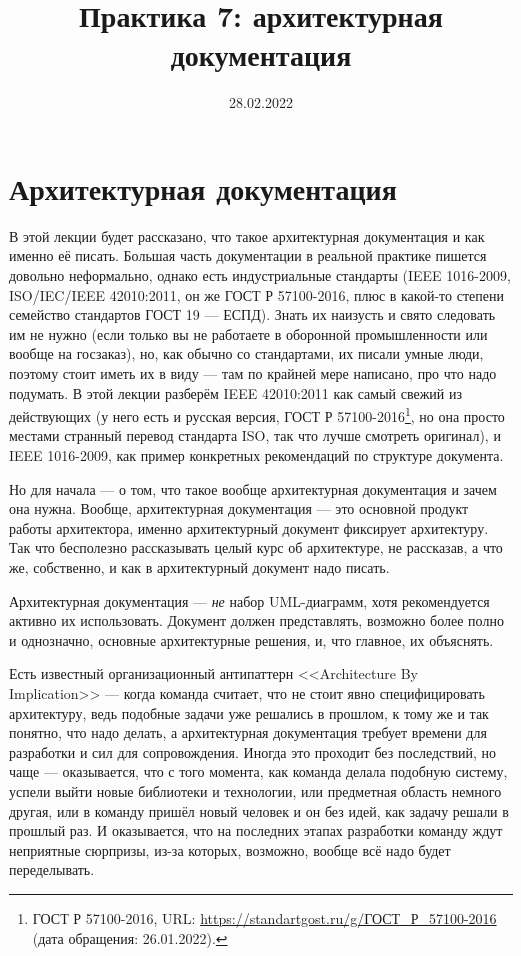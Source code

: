 \documentclass[a5paper]{article}
\title{Практика 7: архитектурная документация}
\author{}
\date{28.02.2022}
\begin{document}
\maketitle
\thispagestyle{empty}

\section{Архитектурная документация}

В этой лекции будет рассказано, что такое архитектурная документация и как именно её писать. Большая часть документации в реальной практике пишется довольно неформально, однако есть индустриальные стандарты (IEEE 1016-2009, ISO/IEC/IEEE 42010:2011, он же ГОСТ Р 57100-2016, плюс в какой-то степени семейство стандартов ГОСТ 19 --- ЕСПД). Знать их наизусть и свято следовать им не нужно (если только вы не работаете в оборонной промышленности или вообще на госзаказ), но, как обычно со стандартами, их писали умные люди, поэтому стоит иметь их в виду --- там по крайней мере написано, про что надо подумать. В этой лекции разберём IEEE 42010:2011 как самый свежий из действующих  (у него есть и русская версия, ГОСТ Р 57100-2016\footnote{ГОСТ Р 57100-2016, URL: \url{https://standartgost.ru/g/ГОСТ_Р_57100-2016} (дата обращения: 26.01.2022).}, но она просто местами странный перевод стандарта ISO, так что лучше смотреть оригинал), и IEEE 1016-2009, как пример конкретных рекомендаций по структуре документа.

Но для начала --- о том, что такое вообще архитектурная документация и зачем она нужна. Вообще, архитектурная документация --- это основной продукт работы архитектора, именно архитектурный документ фиксирует архитектуру. Так что бесполезно рассказывать целый курс об архитектуре, не рассказав, а что же, собственно, и как в архитектурный документ надо писать.

Архитектурная документация --- \emph{не} набор UML-диаграмм, хотя рекомендуется активно их использовать. Документ должен представлять, возможно более полно и однозначно, основные архитектурные решения, и, что главное, их объяснять. 

Есть известный организационный антипаттерн <<Architecture By Implication>> --- когда команда считает, что не стоит явно специфицировать архитектуру, ведь подобные задачи уже решались в прошлом, к тому же и так понятно, что надо делать, а архитектурная документация требует времени для разработки и сил для сопровождения. Иногда это проходит без последствий, но чаще --- оказывается, что с того момента, как команда делала подобную систему, успели выйти новые библиотеки и технологии, или предметная область немного другая, или в команду пришёл новый человек и он без идей, как задачу решали в прошлый раз. И оказывается, что на последних этапах разработки команду ждут неприятные сюрпризы, из-за которых, возможно, вообще всё надо будет переделывать. 
\end{document}
